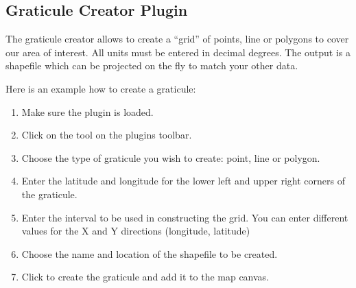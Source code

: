 \subsection{Graticule Creator Plugin}

\updatedisclaimer

The graticule creator allows to create a ``grid'' of points, line or polygons to cover our area of interest.
All units must be entered in decimal degrees.
The output is a shapefile which can be projected on the fly to match your other data.


Here is an example how to create a graticule:

\begin{enumerate}
\item Make sure the plugin is loaded.
\item Click on the  tool on the plugins toolbar.
\item Choose the type of graticule you wish to create: point, line or polygon.
\item Enter the latitude and longitude for the lower left and upper right corners of the graticule.
\item Enter the interval to be used in constructing the grid. You can enter different values for the X and Y directions (longitude, latitude)
\item Choose the name and location of the shapefile to be created.
\item Click  to create the graticule and add it to the map canvas.
\end{enumerate} 


